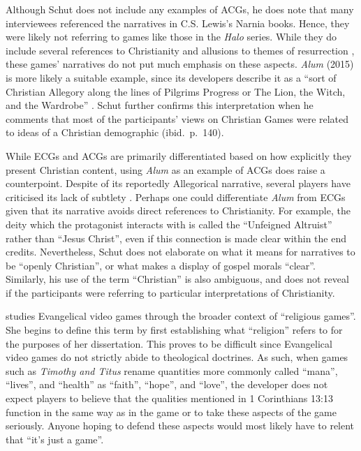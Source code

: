 Although Schut does not include any examples of \acp{ACG}, he does note that many interviewees referenced the narratives in C.S. Lewis's Narnia books. Hence, they were likely not referring to games like those in the \textit{Halo} series. While they do include several references to Christianity and allusions to themes of resurrection \parencite{paulissen_dark_2018}, these games' narratives do not put much emphasis on these aspects. \textit{Alum} (2015) is more likely a suitable example, since its developers describe it as a ``sort of Christian Allegory along the lines of Pilgrims Progress or The Lion, the Witch, and the Wardrobe'' \parencite{crashable_studios_alum_2015}. Schut further confirms this interpretation when he comments that most of the participants' views on Christian Games were related to ideas of a Christian demographic (ibid.~p.~140).

While \acp{ECG} and \acp{ACG} are primarily differentiated based on how explicitly they present Christian content, using \textit{Alum} as an example of \acp{ACG} does raise a counterpoint. Despite of its reportedly Allegorical narrative, several players have criticised its lack of subtlety \parencite {arkane_review_2015, baxted_review_2015, virotti_review_2017}. Perhaps one could differentiate \textit{Alum} from \acp{ECG} given that its narrative avoids direct references to Christianity. For example, the deity which the protagonist interacts with is called the ``Unfeigned Altruist'' rather than ``Jesus Christ'', even if this connection is made clear within the end credits. Nevertheless, Schut does not elaborate on what it means for narratives to be ``openly Christian'', or what makes a display of gospel morals ``clear''. Similarly, his use of the term ``Christian'' is also ambiguous, and does not reveal if the participants were referring to particular interpretations of Christianity.

\textcite{gonzalez_born-again_2014} studies Evangelical video games through the broader context of ``religious games''. She begins to define this term by first establishing what ``religion'' refers to for the purposes of her dissertation. This proves to be difficult since Evangelical video games do not strictly abide to theological doctrines. As such, when games such as \textit{Timothy and Titus} rename quantities more commonly called ``mana'', ``lives'', and ``health'' as ``faith'', ``hope'', and ``love'', the developer does not expect players to believe that the qualities mentioned in 1 Corinthians 13:13 function in the same way as in the game or to take these aspects of the game seriously. Anyone hoping to defend these aspects would most likely have to relent that ``it's just a game''. 


